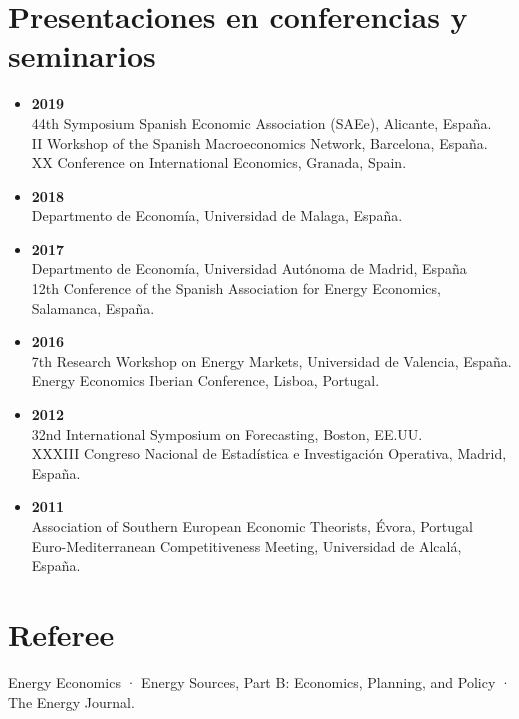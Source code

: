 \documentclass[11pt]{article}\usepackage[]{graphicx}\usepackage[]{color}
\begin{document}
\section{Presentaciones en conferencias y seminarios} 

\begin{itemize}
  \item \textbf{2019}\\
  44th Symposium Spanish Economic Association (SAEe), Alicante, España.\\
  II Workshop of the Spanish Macroeconomics Network, Barcelona, España.\\
  XX Conference on International Economics, Granada, Spain.
  \item \textbf{2018}\\
  Departmento de Economía, Universidad de Malaga, España.
    \item \textbf{2017}\\
  Departmento de Economía, Universidad Autónoma de Madrid, España\\
  12th Conference of the Spanish Association for Energy Economics, Salamanca, España.
  \item \textbf{2016}\\
  7th Research Workshop on Energy Markets, Universidad de Valencia, España.\\
  Energy Economics Iberian Conference, Lisboa, Portugal.
  \item \textbf{2012}\\
  32nd International Symposium on Forecasting, Boston, EE.UU.\\
  XXXIII Congreso Nacional de Estadística e Investigación Operativa, Madrid, España.
  \item \textbf{2011}\\
  Association of Southern European Economic Theorists, Évora, Portugal\\
  Euro-Mediterranean Competitiveness Meeting, Universidad de Alcalá, España.
\end{itemize}

\section{Referee} 
\raggedright

Energy Economics · Energy Sources, Part B: Economics, Planning, and Policy · The Energy Journal.

\end{document}
